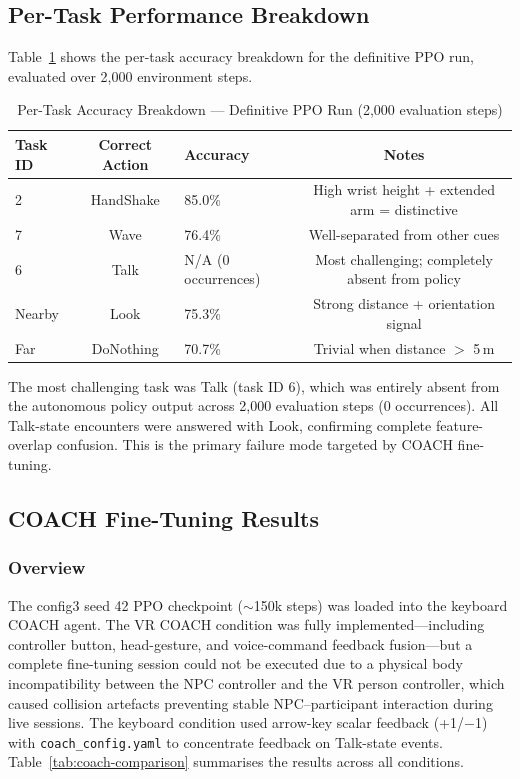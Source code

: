\documentclass[../report.tex]{subfiles}
\begin{document}
    \subsection{Per-Task Performance Breakdown}

    Table~\ref{tab:per-task} shows the per-task accuracy breakdown for the definitive PPO run, evaluated over 2,000 environment steps.

    \begin{table}[t]
        \centering
        \caption{Per-Task Accuracy Breakdown --- Definitive PPO Run (2,000 evaluation steps)}
        \label{tab:per-task}
        \begin{tabular}{lclc}
            \toprule
            \textbf{Task ID} & \textbf{Correct Action} & \textbf{Accuracy} & \textbf{Notes} \\
            \midrule
            2      & HandShake & 85.0\% & High wrist height + extended arm = distinctive \\
            7      & Wave      & 76.4\% & Well-separated from other cues \\
            6      & Talk      & N/A (0 occurrences) & Most challenging; completely absent from policy \\
            Nearby & Look      & 75.3\% & Strong distance + orientation signal \\
            Far    & DoNothing & 70.7\% & Trivial when distance $>$ 5\,m \\
            \bottomrule
        \end{tabular}
    \end{table}

    The most challenging task was Talk (task ID 6), which was entirely absent from the autonomous policy output across 2,000 evaluation steps (0 occurrences). All Talk-state encounters were answered with Look, confirming complete feature-overlap confusion. This is the primary failure mode targeted by COACH fine-tuning.

    \subsection{COACH Fine-Tuning Results}
    \label{sec:eval:coach}

    \subsubsection{Overview}

    The config3 seed 42 PPO checkpoint ($\sim$150k steps) was loaded into the keyboard COACH agent. The VR COACH condition was fully implemented---including controller button, head-gesture, and voice-command feedback fusion---but a complete fine-tuning session could not be executed due to a physical body incompatibility between the NPC controller and the VR person controller, which caused collision artefacts preventing stable NPC--participant interaction during live sessions. The keyboard condition used arrow-key scalar feedback (+1/$-$1) with \texttt{coach\_config.yaml} to concentrate feedback on Talk-state events. Table~\ref{tab:coach-comparison} summarises the results across all conditions.
\end{document}
